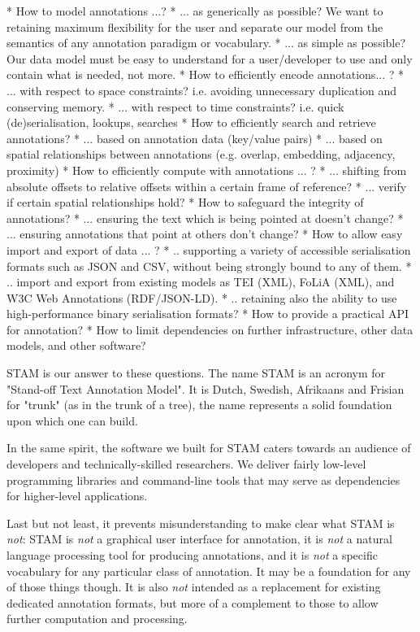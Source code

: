 \documentclass{jors}
\begin{document}
* How to model annotations  ...?
    * ... as generically as possible? We want to retaining maximum flexibility for the user and separate our model from the semantics of any annotation paradigm or vocabulary.
    * ... as simple as possible? Our data model must be easy to understand for a user/developer to use and only contain what is needed, not more.
* How to efficiently encode annotations... ?
   * ... with respect to space constraints? i.e. avoiding unnecessary duplication and conserving memory.
   * ... with respect to time constraints? i.e. quick (de)serialisation, lookups, searches
* How to efficiently search and retrieve annotations?
    * ... based on annotation data (key/value pairs)
    * ... based on spatial relationships between annotations (e.g. overlap, embedding, adjacency, proximity)
* How to efficiently compute with annotations ... ?
    * ... shifting from absolute offsets to relative offsets within a certain frame of reference?
    * ... verify if certain spatial relationships hold?
* How to safeguard the integrity of annotations?
    * ... ensuring the text which is being pointed at doesn't change?
    * ... ensuring annotations that point at others don't change?
* How to allow easy import and export of data ... ? 
    * .. supporting a variety of accessible serialisation formats such as JSON and CSV, without being strongly bound to any of them.
    * .. import and export from existing models as TEI (XML), FoLiA (XML), and W3C Web Annotations (RDF/JSON-LD).
    * .. retaining also the ability to use high-performance binary serialisation formats?
* How to provide a practical API for annotation?
* How to limit dependencies on further infrastructure, other data models, and other software?

STAM is our answer to these questions. The name STAM is an acronym for
"Stand-off Text Annotation Model". It is Dutch, Swedish, Afrikaans and Frisian for
"trunk" (as in the trunk of a tree), the name represents a solid foundation
upon which one can build.

In the same spirit, the software we built for STAM caters towards an audience
of developers and technically-skilled researchers. We deliver fairly low-level
programming libraries and command-line tools that may serve as dependencies for
higher-level applications. 

Last but not least, it prevents misunderstanding to make clear what STAM is
\emph{not}: STAM is \emph{not} a graphical user interface for annotation, it is
\emph{not} a natural language processing tool for producing annotations, and it
is \emph{not} a specific vocabulary for any particular class of annotation. It
may be a foundation for any of those things though. It is also \emph{not}
intended as a replacement for existing dedicated annotation formats, but more
of a complement to those to allow further computation and processing.
\end{document}
